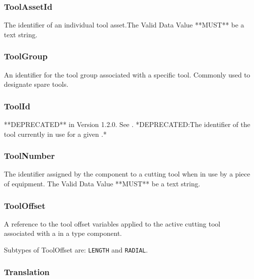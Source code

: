 \subsubsection{ToolAssetId}
  \label{sec:ToolAssetId}


The identifier of an individual tool asset.The \gls{Valid Data Value} **MUST** be a text string.

\FloatBarrier

\subsubsection{ToolGroup}
  \label{sec:ToolGroup}


An identifier for the tool group associated with a specific tool. Commonly used to designate spare tools.

\FloatBarrier

\subsubsection{ToolId}
  \label{sec:ToolId}


**DEPRECATED** in Version 1.2.0.   See . *DEPRECATED:The identifier of the tool currently in use for a given .*

\FloatBarrier

\subsubsection{ToolNumber}
  \label{sec:ToolNumber}


The identifier assigned by the  component to a cutting tool when in use by a piece of equipment. 
 The \gls{Valid Data Value} **MUST** be a text string.

\FloatBarrier

\subsubsection{ToolOffset}
  \label{sec:ToolOffset}


A reference to the tool offset variables applied to the active cutting tool associated with a  in a  type component.


Subtypes of ToolOffset are: \texttt{LENGTH} and \texttt{RADIAL}. 
\FloatBarrier

\subsubsection{Translation}
  \label{sec:Translation}


